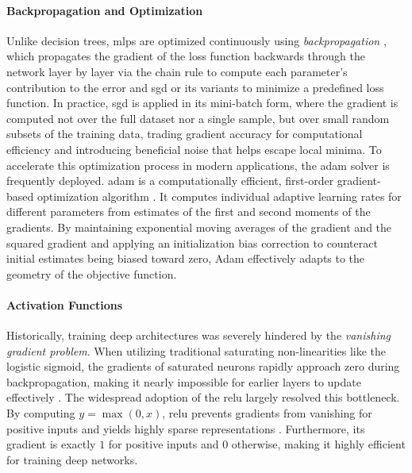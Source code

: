 \paragraph{Backpropagation and Optimization}
Unlike decision trees, \glspl{mlp} are optimized continuously using \textit{backpropagation} \parencite{rumelhartLearningRepresentationsBackpropagating1986}, which propagates the gradient of the loss function backwards through the network layer by layer via the chain rule to compute each parameter's contribution to the error and \gls{sgd} or its variants to minimize a predefined loss function. In practice, \gls{sgd} is applied in its mini-batch form, where the gradient is computed not over the full dataset nor a single sample, but over small random subsets of the training data, trading gradient accuracy for computational efficiency and introducing beneficial noise that helps escape local minima. To accelerate this optimization process in modern applications, the \gls{adam} solver is frequently deployed. \Gls{adam} is a computationally efficient, first-order gradient-based optimization algorithm \parencite{kingmaAdamMethodStochastic2015}. It computes individual adaptive learning rates for different parameters from estimates of the first and second moments of the gradients. By maintaining exponential moving averages of the gradient and the squared gradient and applying an initialization bias correction to counteract initial estimates being biased toward zero, Adam effectively adapts to the geometry of the objective function.

\paragraph{Activation Functions}
Historically, training deep architectures was severely hindered by the \textit{vanishing gradient problem}. When utilizing traditional saturating non-linearities like the logistic sigmoid, the gradients of saturated neurons rapidly approach zero during backpropagation, making it nearly impossible for earlier layers to update effectively \parencite{bengioLearningLongtermDependencies1994}. The widespread adoption of the \gls{relu} largely resolved this bottleneck. By computing $y = \max(0, x)$, \gls{relu} prevents gradients from vanishing for positive inputs and yields highly sparse representations \parencite{hintonRectifiedLinearUnits2010}. Furthermore, its gradient is exactly $1$ for positive inputs and $0$ otherwise, making it highly efficient for training deep networks.

